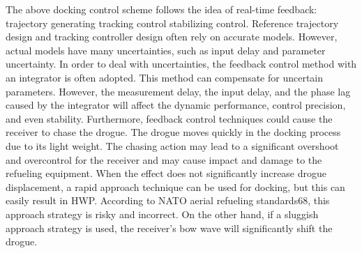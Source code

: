 The above docking control scheme follows the idea of real-time feedback:
trajectory generating tracking control stabilizing control. Reference
trajectory design and tracking controller design often rely on accurate
models. However, actual models have many uncertainties, such as input
delay and parameter uncertainty. In order to deal with uncertainties,
the feedback control method with an integrator is often adopted. This
method can compensate for uncertain parameters. However, the measurement
delay, the input delay, and the phase lag caused by the integrator
will affect the dynamic performance, control precision, and even stability.
Furthermore, feedback control techniques could cause the receiver
to chase the drogue. The drogue moves quickly in the docking process
due to its light weight. The chasing action may lead to a significant
overshoot and overcontrol for the receiver and may cause impact and
damage to the refueling equipment\cite{ro2011dynamics}. When the
effect does not significantly increase drogue displacement, a rapid
approach technique can be used for docking, but this can easily result
in HWP. According to NATO aerial refueling standards68, this approach
strategy is risky and incorrect. On the other hand, if a sluggish
approach strategy is used, the receiver's bow wave will significantly
shift the drogue. 

